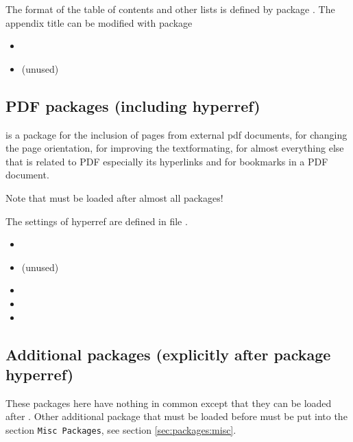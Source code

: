The format of the table of contents and other lists is defined by package . The appendix title can be modified with package 

\begin{itemize}[noitemsep]
\item {}
\item {} (unused)
\end{itemize}


\subsection{PDF packages (including hyperref)}

 is a package for the inclusion of pages from external pdf documents,
 for changing the page orientation,
 for improving the textformating,
 for almost everything else that is related to PDF especially its hyperlinks and 
 for bookmarks in a PDF document.

Note that  must be loaded after almost all packages!

The settings of hyperref are defined in file 
.

\begin{itemize}[noitemsep]
\item {}
\item {} (unused)
\item {}
\item {}
\item {}
\end{itemize}


\subsection{Additional packages  (explicitly after package hyperref)}

These packages here have nothing in common except that they can be loaded after . Other additional package that must be loaded before must be put into the section \texttt{Misc Packages}, see section \cref{sec:packages:misc}.

